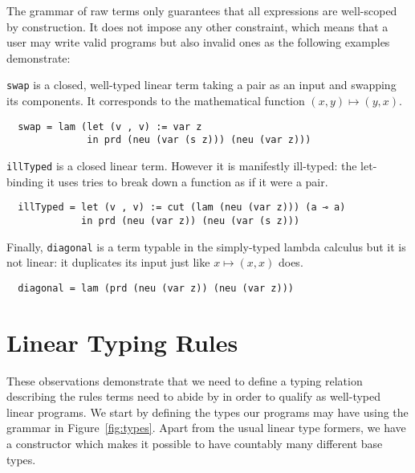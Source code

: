 
The grammar of raw terms only guarantees that all expressions are
well-scoped by construction. It does not impose any other constraint,
which means that a user may write valid programs but also invalid
ones as the following examples demonstrate:

\begin{example}\label{example:swap}
\texttt{swap} is a closed, well-typed linear term taking a pair as
an input and swapping its components. It corresponds to the mathematical
function $(x, y) \mapsto (y, x)$.
\begin{lstlisting}
  swap = lam (let (v , v) := var z
              in prd (neu (var (s z))) (neu (var z)))
\end{lstlisting}
\end{example}

\begin{example}\label{example:illTyped}
\texttt{illTyped} is a closed linear term. However it is manifestly
ill-typed: the let-binding it uses tries to break down a function as
if it were a pair.
\begin{lstlisting}
  illTyped = let (v , v) := cut (lam (neu (var z))) (a ⊸ a)
             in prd (neu (var z)) (neu (var (s z)))
\end{lstlisting}
\end{example}

\begin{example}\label{example:diagonal}
Finally, \texttt{diagonal} is a term typable in the simply-typed
lambda calculus but it is not linear: it duplicates its input just
like $x \mapsto (x, x)$ does.
\begin{lstlisting}
  diagonal = lam (prd (neu (var z)) (neu (var z)))
\end{lstlisting}
\end{example}

\section{Linear Typing Rules}\label{sec:typingrules}

These observations demonstrate that we need to define a typing
relation describing the rules terms need to abide by in order
to qualify as well-typed linear programs. We start by defining
the types our programs may have using the grammar in Figure~\ref{fig:types}.
Apart from the usual linear type formers, we have a constructor
\Base{} which makes it possible to have countably many different
base types.

